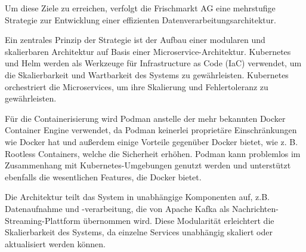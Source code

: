 \documentclass[%
pdftex,
oneside,			%
11pt,				%
parskip=half,		%
headheight = 12pt,	%
headsepline,		%
footsepline,		%
footheight = 16pt,	%
abstracton,		%
DIV=calc,		%
BCOR=8mm,		%
headinclude=false,	%
footinclude=false,	%
listof=totoc,		%
toc=bibliography,	%
]{scrreprt}	%
\begin{document}
    Um diese Ziele zu erreichen, verfolgt die Frischmarkt AG eine mehrstufige Strategie zur Entwicklung einer effizienten Datenverarbeitungsarchitektur.


    Ein zentrales Prinzip der Strategie ist der Aufbau einer modularen und skalierbaren Architektur auf Basis einer Microservice-Architektur.
    Kubernetes und Helm werden als Werkzeuge für Infrastructure as Code (IaC) verwendet, um die Skalierbarkeit und Wartbarkeit des Systems zu gewährleisten.
    Kubernetes orchestriert die Microservices, um ihre Skalierung und Fehlertoleranz zu gewährleisten.

    Für die Containerisierung wird Podman anstelle der mehr bekannten Docker Container Engine verwendet, da Podman keinerlei proprietäre Einschränkungen wie Docker hat und außerdem einige Vorteile gegenüber Docker bietet, wie z. B. Rootless Containers, welche die Sicherheit erhöhen.
    Podman kann problemlos im Zusammenhang mit Kubernetes-Umgebungen genutzt werden und unterstützt ebenfalls die wesentlichen Features, die Docker bietet.

    Die Architektur teilt das System in unabhängige Komponenten auf, z.B. Datenaufnahme und -verarbeitung, die von Apache Kafka als Nachrichten-Streaming-Plattform übernommen wird.
    Diese Modularität erleichtert die Skalierbarkeit des Systems, da einzelne Services unabhängig skaliert oder aktualisiert werden können.

\end{document}
